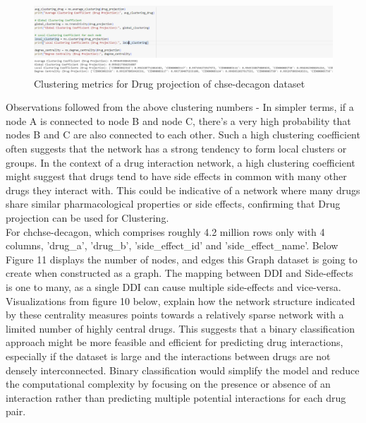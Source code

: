 \documentclass[journal,transmag]{J-NaNA}
\begin{document}
\begin{figure}[htbp]
\centering
\includegraphics[width=\linewidth]{graph-metrics-drug-projection.PNG} 
\caption{Clustering metrics for Drug projection of chse-decagon dataset}
\label{fig: chse-decagon drug projection clustering metrics} %
\end{figure}
Observations followed from the above clustering numbers - In simpler terms, if a node A is connected to node B and node C, there's a very high probability that nodes B and C are also connected to each other. Such a high clustering coefficient often suggests that the network has a strong tendency to form local clusters or groups. In the context of a drug interaction network, a high clustering coefficient might suggest that drugs tend to have side effects in common with many other drugs they interact with. This could be indicative of a network where many drugs share similar pharmacological properties or side effects, confirming that Drug projection can be used for Clustering.
\\

For chchse-decagon, which comprises roughly 4.2 million rows only with 4 columns, 'drug\_a', 'drug\_b', 'side\_effect\_id' and 'side\_effect\_name'. Below Figure 11 displays the number of nodes, and edges this Graph dataset is going to create when constructed as a graph. The mapping between DDI and Side-effects is one to many, as a single DDI can cause multiple side-effects and vice-versa. Visualizations from figure 10 below, explain how the network structure indicated by these centrality measures points towards a relatively sparse network with a limited number of highly central drugs. This suggests that a binary classification approach might be more feasible and efficient for predicting drug interactions, especially if the dataset is large and the interactions between drugs are not densely interconnected. Binary classification would simplify the model and reduce the computational complexity by focusing on the presence or absence of an interaction rather than predicting multiple potential interactions for each drug pair. 
\end{document}
